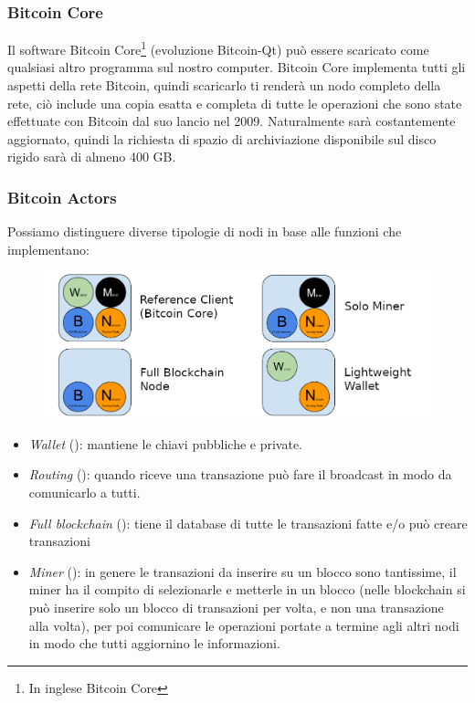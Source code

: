 \newpage

\subsubsection{Bitcoin Core}

Il software Bitcoin Core\footnote{In inglese Bitcoin Core
    } (evoluzione Bitcoin-Qt) può essere scaricato come
qualsiasi altro programma sul nostro computer. Bitcoin Core implementa tutti
gli aspetti della rete Bitcoin, quindi scaricarlo ti renderà un nodo
completo della rete, ciò include una copia esatta e completa di tutte le
operazioni che sono state effettuate con Bitcoin dal suo lancio nel 2009.
Naturalmente sarà costantemente aggiornato, quindi la richiesta di spazio di
archiviazione disponibile sul disco rigido sarà di almeno 400 GB.

\subsubsection{Bitcoin Actors}

Possiamo distinguere diverse tipologie di nodi in base alle funzioni che
implementano:

\begin{figure}[H]
    \centering
    \includegraphics[width=14cm, keepaspectratio]{capitoli/bitcoin/imgs/bit33.png}
\end{figure}

\begin{itemize}
    \item \textit{Wallet} (): mantiene le chiavi pubbliche e private.
    \item \textit{Routing} (): quando riceve una transazione può fare il
          broadcast in modo da comunicarlo a tutti.
    \item \textit{Full blockchain} (): tiene il database di tutte le transazioni fatte
          e/o può creare transazioni
    \item \textit{Miner} (): in genere le transazioni da inserire su un blocco sono
          tantissime, il miner ha il compito di selezionarle e metterle in un
          blocco (nelle blockchain si può inserire solo un blocco di transazioni
          per volta, e non una transazione alla volta), per poi comunicare le
          operazioni portate a termine agli altri nodi in modo che tutti
          aggiornino le informazioni.
\end{itemize}

